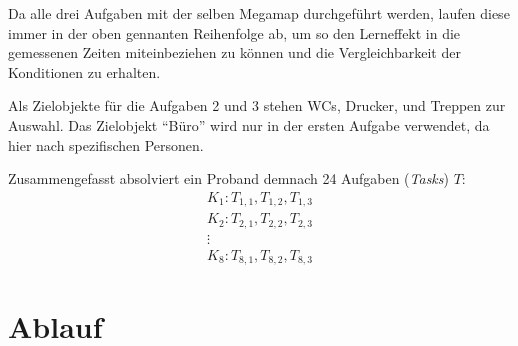 \documentclass[
    draft=false,
    paper=a4,
    fontsize=11pt,
    twoside=false,
    captions=tableheading,
    british, ngerman,
]{scrartcl}
\begin{document}
Da alle drei Aufgaben mit der selben Megamap durchgeführt werden, laufen diese immer in der oben gennanten Reihenfolge ab, um so den Lerneffekt in die gemessenen Zeiten miteinbeziehen zu können und die Vergleichbarkeit der Konditionen zu erhalten.

Als Zielobjekte für die Aufgaben 2 und 3 stehen WCs, Drucker, und Treppen zur Auswahl.
Das Zielobjekt \enquote{Büro} wird nur in der ersten Aufgabe verwendet, da hier nach spezifischen Personen.

Zusammengefasst absolviert ein Proband demnach 24 Aufgaben (\emph{Tasks}) $T$:
\begin{gather*}
    K_1: T_{1, 1}, T_{1, 2}, T_{1, 3} \\
    K_2: T_{2, 1}, T_{2, 2}, T_{2, 3} \\
    \vdots \\
    K_8: T_{8, 1}, T_{8, 2}, T_{8, 3}
\end{gather*}

\section{Ablauf}
\end{document}
